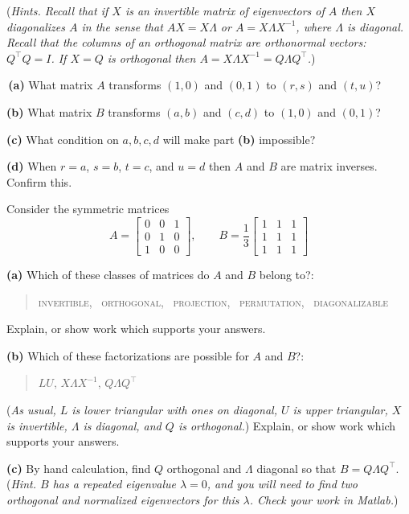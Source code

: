 \documentclass[12pt]{amsart}
\newcommand{\prob}[1]{\bigskip\noindent{\large \textbf{#1.}}\quad }
\newcommand{\epart}[1]{\medskip\noindent\textbf{(#1)}\quad }
\newcommand{\ppart}[1]{\,\textbf{(#1)}\quad }
\begin{document}
\medskip
\noindent (\emph{Hints.  Recall that if $X$ is an invertible matrix of eigenvectors of $A$ then $X$ diagonalizes $A$ in the sense that $AX=X\Lambda$ or $A=X \Lambda X^{-1}$, where $\Lambda$ is diagonal.  Recall that the columns of an orthogonal matrix are orthonormal vectors: $Q^\top Q=I$.  If $X=Q$ is orthogonal then $A=X \Lambda X^{-1}=Q \Lambda Q^\top$.})


\prob{P58}  \ppart{a} What matrix $A$ transforms $(1,0)$ and $(0,1)$ to $(r,s)$ and $(t,u)$?

\epart{b} What matrix $B$ transforms $(a,b)$ and $(c,d)$ to $(1,0)$ and $(0,1)$?

\epart{c} What condition on $a,b,c,d$ will make part \textbf{(b)} impossible?

\epart{d} When $r=a$, $s=b$, $t=c$, and $u=d$ then $A$ and $B$ are matrix inverses.  Confirm this.


\clearpage\newpage
\prob{P59}  Consider the symmetric matrices
    $$A = \begin{bmatrix} 0 & 0 & 1 \\ 0 & 1 & 0 \\ 1 & 0 & 0 \end{bmatrix}, \qquad B = \frac{1}{3} \begin{bmatrix} 1 & 1 & 1 \\ 1 & 1 & 1 \\ 1 & 1 & 1 \end{bmatrix}$$

\epart{a}  Which of these classes of matrices do $A$ and $B$ belong to?:
\begin{quote}
{\small
\textsc{invertible, \, orthogonal, \, projection, \, permutation, \, diagonalizable}
}
\end{quote}
Explain, or show work which supports your answers.

\epart{b}  Which of these factorizations are possible for $A$ and $B$?:
\begin{quote}
$LU$, \quad $X\Lambda X^{-1}$, \quad $Q \Lambda Q^\top$
\end{quote}
(\emph{As usual, $L$ is lower triangular with ones on diagonal, $U$ is upper triangular, $X$ is invertible, $\Lambda$ is diagonal, and $Q$ is orthogonal.})  Explain, or show work which supports your answers.

\epart{c}  By hand calculation, find $Q$ orthogonal and $\Lambda$ diagonal so that $B=Q \Lambda Q^\top$.  (\emph{Hint.  $B$ has a repeated eigenvalue $\lambda=0$, and you will need to find \emph{two} orthogonal and normalized eigenvectors for this $\lambda$.  Check your work in Matlab.})
\end{document}
